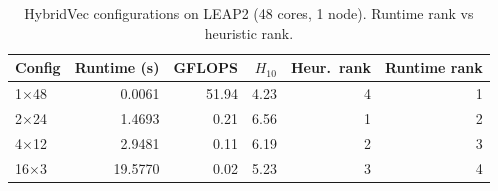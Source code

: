 \begin{table}[t]
  \centering
  \caption{HybridVec configurations on LEAP2 (48 cores, 1 node). Runtime rank vs heuristic rank.}
  \label{tab:hybrid-vec-leap2}
  \begin{tabular}{lrrrrr}
    \hline
    Config & Runtime (s) & GFLOPS & $H_{10}$ & Heur.\ rank & Runtime rank \\
    \hline
    1$\times$48  & 0.0061 & 51.94 & 4.23 & 4 & 1 \\
    2$\times$24  & 1.4693 & 0.21  & 6.56 & 1 & 2 \\
    4$\times$12  & 2.9481 & 0.11  & 6.19 & 2 & 3 \\
    16$\times$3  & 19.5770 & 0.02 & 5.23 & 3 & 4 \\
    \hline
  \end{tabular}
\end{table}

